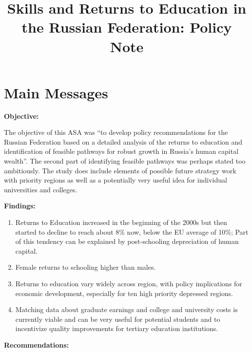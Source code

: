\documentclass[alpha-refs]{wiley-article-04t}
\title{Skills and Returns to Education in the Russian Federation: Policy Note}
\author[]{}
\begin{document}
\maketitle
\vspace{-2.5cm}


\section{Main Messages}

\vspace{-0.5em}

\begin{mdframed}[hidealllines=true,backgroundcolor=blue!20]
	
\textbf{Objective:} 

The objective of this ASA was ``to develop policy recommendations for the 
Russian Federation based on a detailed analysis of the returns to education 
and identification of feasible pathways for robust growth in Russia's human 
capital wealth''. The second part of identifying feasible pathways was 
perhaps stated too ambitiously. The study does include elements of possible 
future strategy work with priority regions as well as a potentially very 
useful idea for individual universities and colleges. 
\vspace{0.5em}


\hspace{-1.8em}  \textbf{Findings:} 
\begin{enumerate}
\item Returns to Education increased in the beginning of the 2000s but then 
started to decline to reach about 8\% now, below the EU average of 10\%; 
Part of this tendency can be explained by post-schooling depreciation of 
human capital.

\item Female returns to schooling higher than males.

\item Returns to education vary widely across region, with policy	
implications for economic development, especially for ten high priority 
depressed regions.

\item Matching data about graduate earnings and college and university 
costs is currently viable and can be very useful for potential students and 
to incentivize quality improvements for tertiary education institutions.
\end{enumerate} 

\hspace{-1.8em}  \textbf{Recommendations:} 
\begin{enumerate}


\end{enumerate}
\end{mdframed}
\end{document}
